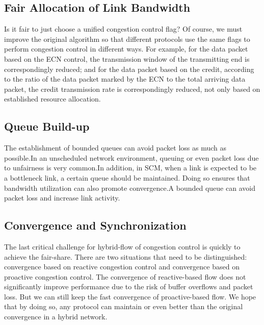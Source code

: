 \documentclass[conference]{IEEEtran}
\begin{document}
\subsection{Fair Allocation of Link Bandwidth}



Is it fair to just choose a unified congestion control flag? Of course, we must improve the original algorithm so that different protocols use the same flags to perform congestion control in different ways. For example, for the data packet based on the ECN control, the transmission window of the transmitting end is correspondingly reduced; and for the data packet based on the credit, according to the ratio of the data packet marked by the ECN to the total arriving data packet, the credit transmission rate is correspondingly reduced, not only based on established resource allocation.





\subsection{Queue Build-up}

The establishment of bounded queues can avoid packet loss as much as possible.In an unscheduled network environment, queuing or even packet loss due to unfairness is very common.In addition, in SCM, when a link is expected to be a bottleneck link, a certain queue should be maintained. Doing so ensures that bandwidth utilization can also promote convergence.A bounded queue can avoid packet loss and increase link activity.



\subsection{Convergence and Synchronization}



The last critical challenge for hybrid-flow of congestion control is quickly to achieve the fair-share. There are two situations that need to be distinguished: convergence based on reactive congestion control and convergence based on proactive congestion control. The convergence of reactive-based flow does not significantly improve performance due to the risk of buffer overflows and packet loss. But we can still keep the fast convergence of proactive-based flow. We hope that by doing so, any protocol can maintain or even better than the original convergence in a hybrid network.
\end{document}
